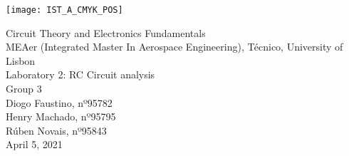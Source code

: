 
\thispagestyle {empty}

\texttt{[image: IST\_A\_CMYK\_POS]}

\begin{center}
%
\vspace{1.0cm}

\vspace{1cm}
{\FontLb Circuit Theory and Electronics Fundamentals} \\ %
\vspace{1cm}
{\FontSn MEAer (Integrated Master In Aerospace Engineering), Técnico, University of Lisbon} \\ %
\vspace{1cm}
{\FontSn Laboratory 2: RC Circuit analysis} \\
\vspace{1cm}
{\FontSn Group 3} \\
\vspace{0.7cm}
{\FontSn Diogo Faustino, nº95782} \\
\vspace{0.4mm}
{\FontSn Henry Machado, nº95795} \\
\vspace{0.4mm}
{\FontSn Rúben Novais, nº95843} \\
\vspace{1cm}
{\FontSn April 5, 2021} \\ %
%
\end{center}

